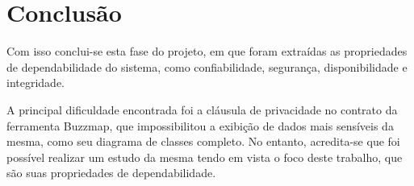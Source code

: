 \chapter{Conclusão}
Com isso conclui-se esta fase do projeto, em que foram extraídas as
propriedades de dependabilidade do sistema, como confiabilidade,
segurança, disponibilidade e integridade.

A principal dificuldade encontrada foi a cláusula de privacidade no
contrato da ferramenta Buzzmap, que impossibilitou a exibição de dados
mais sensíveis da mesma, como seu diagrama de classes completo. No
entanto, acredita-se que foi possível realizar um estudo da mesma
tendo em vista o foco deste trabalho, que são suas propriedades de
dependabilidade.
